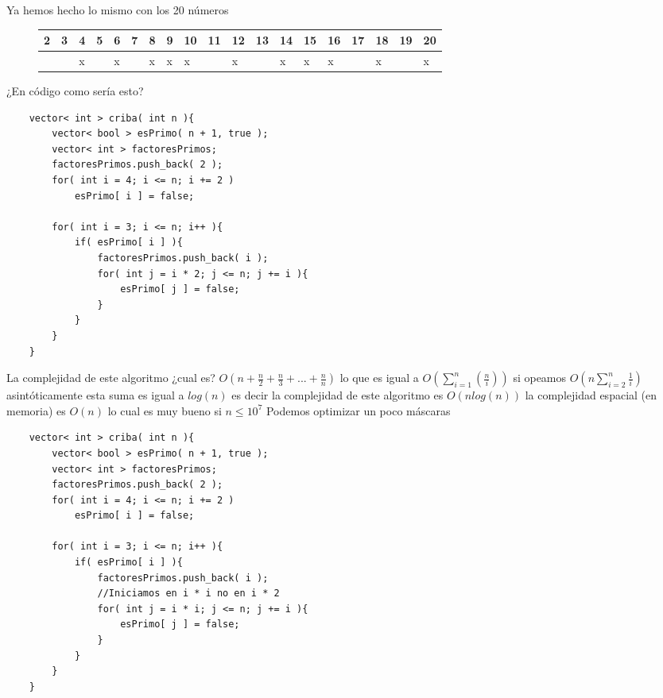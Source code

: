 Ya hemos hecho lo mismo con los 20 números
\begin{figure}[H]
\begin{longtable}[c]{|l|l|l|l|l|l|l|l|l|l|l|l|l|l|l|l|l|l|l|}
    \hline
    \rowcolor[HTML]{EFEFEF} 
    {\color[HTML]{333333} 2} & {\color[HTML]{333333} 3} & {\color[HTML]{333333} 4} & {\color[HTML]{333333} 5} & {\color[HTML]{333333} 6} & {\color[HTML]{333333} 7} & {\color[HTML]{333333} 8} & {\color[HTML]{333333} 9} & {\color[HTML]{333333} 10} & {\color[HTML]{333333} 11} & {\color[HTML]{333333} 12} & {\color[HTML]{333333} 13} & 14 & 15 & 16 & 17 & 18 & 19 & 20 \\ \hline
    \endfirsthead
    \endhead
    \rowcolor[HTML]{FFFFFF} 
     & {\color[HTML]{C0C0C0} } & x &  & x &  & x & x & x &  & x &  & x & x & x &  & x &  & x \\ \hline
    \end{longtable}
\end{figure}

¿En código como sería esto?

\begin{lstlisting}
    vector< int > criba( int n ){
        vector< bool > esPrimo( n + 1, true );
        vector< int > factoresPrimos;
        factoresPrimos.push_back( 2 );
        for( int i = 4; i <= n; i += 2 )
            esPrimo[ i ] = false;
        
        for( int i = 3; i <= n; i++ ){
            if( esPrimo[ i ] ){
                factoresPrimos.push_back( i );
                for( int j = i * 2; j <= n; j += i ){
                    esPrimo[ j ] = false;
                }
            }
        }
    }
\end{lstlisting}

La complejidad de este algoritmo ¿cual es? $O\left ( n + \frac{n}{2} + \frac{n}{3} + ... + \frac{n}{n} \right )$ lo que es igual a $O\left ( \sum_{i = 1}^{n}( \frac{ n }{ i }) \right )$ si opeamos $O\left ( n \sum_{ i = 2 }^{ n } \frac{ 1 }{ i } \right )$ asintóticamente esta suma es igual a $log(n)$ es decir la complejidad de este algoritmo es $O(nlog(n))$ la complejidad espacial (en memoria) es $O(n)$ lo cual es muy bueno si $n \leq 10^{ 7 } $ Podemos optimizar un poco máscaras
\begin{lstlisting}
    vector< int > criba( int n ){
        vector< bool > esPrimo( n + 1, true );
        vector< int > factoresPrimos;
        factoresPrimos.push_back( 2 );
        for( int i = 4; i <= n; i += 2 )
            esPrimo[ i ] = false;
        
        for( int i = 3; i <= n; i++ ){
            if( esPrimo[ i ] ){
                factoresPrimos.push_back( i );
                //Iniciamos en i * i no en i * 2
                for( int j = i * i; j <= n; j += i ){
                    esPrimo[ j ] = false;
                }
            }
        }
    }
\end{lstlisting}

